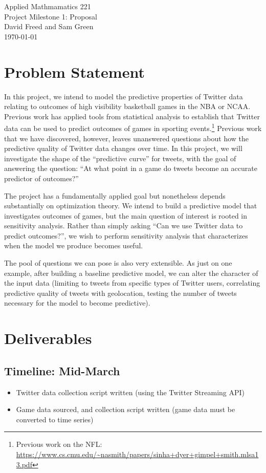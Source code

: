 \documentclass[12pt]{article}
\begin{document}
\begin{center}
{\Large Applied Mathmamatics 221}\\
Project Milestone 1: Proposal\\
David Freed and Sam Green\\
\today
\end{center}

\section{Problem Statement}

In this project, we intend to model the predictive properties of Twitter data relating to outcomes of high visibility basketball games in the NBA or NCAA. Previous work has applied tools from statistical analysis to establish that Twitter data can be used to predict outcomes of games in sporting events.\footnote{Previous work on the NFL: \url{https://www.cs.cmu.edu/~nasmith/papers/sinha+dyer+gimpel+smith.mlsa13.pdf}} Previous work that we have discovered, however, leaves unanswered questions about how the predictive quality of Twitter data changes over time. In this project, we will investigate the shape of the ``predictive curve'' for tweets, with the goal of answering the question: ``At what point in a game do tweets become an accurate predictor of outcomes?''

The project has a fundamentally applied goal but nonetheless depends substantially
on optimization theory. We intend to build a predictive model that investigates
outcomes of games, but the main question of interest is rooted in sensitivity
analysis. Rather than simply asking ``Can we use Twitter data to predict outcomes?'',
we wish to perform sensitivity analysis that characterizes when the model 
we produce becomes useful. 

The pool of questions we can pose is also very extensible. As just on
one example, after building 
a baseline predictive model, we can alter the character of the input data
(limiting to tweets from specific types of Twitter users, correlating predictive
quality of tweets with geolocation, testing the number of tweets necessary 
for the model to become predictive).  

\section{Deliverables}

\subsection{Timeline: Mid-March}  
\begin{itemize}
\item Twitter data collection script written (using the Twitter Streaming API)
\item Game data sourced, and collection script written (game data must be converted to time series)
\end{itemize} 
\end{document}
